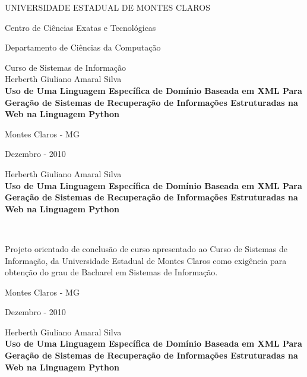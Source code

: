 \documentclass[a4paper,12pt]{report}
\begin{document}
\begin{titlepage}
\begin{center}
UNIVERSIDADE ESTADUAL DE MONTES CLAROS

Centro de Ciências Exatas e Tecnológicas

Departamento de Ciências da Computação

Curso de Sistemas de Informação
\\[2cm]
Herberth Giuliano Amaral Silva
\\[7cm]
\textbf {Uso de Uma Linguagem Específica de Domínio Baseada em XML Para Geração de Sistemas de Recuperação de Informações Estruturadas na Web na Linguagem Python}

\vfill
Montes Claros - MG

Dezembro - 2010



\end{center}
\end{titlepage}

\addtocounter{page}{-1}
\thispagestyle{empty}

\begin{center}
	Herberth Giuliano Amaral Silva
	\\[4cm]
	\textbf{Uso de Uma Linguagem Específica de Domínio Baseada em XML Para Geração de Sistemas de Recuperação de Informações Estruturadas na Web na Linguagem Python}
\end{center}
	\ \\[3cm]
	
\begin{flushright}
	\begin{small}
		\parbox{200pt}{Projeto orientado de conclusão de curso apresentado ao Curso de Sistemas de Informação,	da Universidade Estadual de Montes Claros como exigência para obtenção do grau de Bacharel	em Sistemas de Informação.}
		
	\end{small}
\end{flushright}

\begin{center}	
	\vfill
	Montes Claros - MG
	
	Dezembro - 2010 
\end{center}

\pagebreak
\addtocounter{page}{-1}
\thispagestyle{empty}

\begin{center}
	Herberth Giuliano Amaral Silva
	\\[4cm]
	\textbf{Uso de Uma Linguagem Específica de Domínio Baseada em XML Para Geração de Sistemas de Recuperação de Informações Estruturadas na Web na Linguagem Python}
\end{center}
\end{document}
